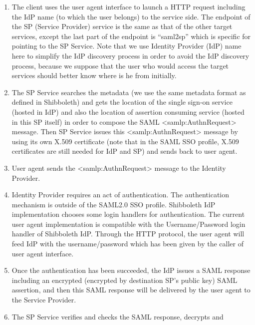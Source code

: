 \documentclass[a4paper]{article}
\newcommand\liststyleLii{%
\renewcommand\theenumi{\arabic{enumi}}
\renewcommand\theenumii{\arabic{enumii}}
\renewcommand\theenumiii{\arabic{enumiii}}
\renewcommand\theenumiv{\arabic{enumiv}}
\renewcommand\labelenumi{\theenumi.}
\renewcommand\labelenumii{\theenumii.}
\renewcommand\labelenumiii{\theenumiii.}
\renewcommand\labelenumiv{\theenumiv.}
}
\begin{document}
\liststyleLii
\begin{enumerate}
\item {\color{black}
The client uses the user agent interface to launch a HTTP request
including the IdP name (to which the user belongs) to the service side.
The endpoint of the SP (Service Provider) service is the same as that
of the other target services, except the last part of the endpoint is
{\textquotedblleft}saml2sp{\textquotedblright} which is specific for
pointing to the SP Service. Note that we use Identity Provider (IdP)
name here to simplify the IdP discovery process in order to avoid the
IdP discovery process, because we suppose that the user who would
access the target services should better know where is he from
initially.}
\item {\color{black}
The SP Service searches the metadata (we use the same metadata format as
defined in Shibboleth) and gets the location of the single sign-on
service (hosted in IdP) and also the location of assertion consuming
service (hosted in this SP itself) in order to compose the SAML
{\textless}samlp:AuthnRequest{\textgreater} message. Then SP Service
issues this {\textless}samlp:AuthnRequest{\textgreater} message by
using its own X.509 certificate (note that in the SAML SSO profile,
X.509 certificates are still needed for IdP and SP) and sends back to
user agent.}
\item {\color{black}
User agent sends the {\textless}samlp:AuthnRequest{\textgreater} message
to the Identity Provider.}
\item {\color{black}
Identity Provider requires an act of authentication. The authentication
mechanism is outside of the SAML2.0 SSO profile. Shibboleth IdP
implementation chooses some login handlers for authentication. The
current user agent implementation is compatible with the
Username/Password login handler of Shibboleth IdP. Through the HTTP
protocol, the user agent will feed IdP with the username/password which
has been given by the caller of user agent interface.}
\item {\color{black}
Once the authentication has been succeeded, the IdP issues a SAML
response including an encrypted (encrypted by destination
SP{\textquoteright}s public key) SAML assertion, and then this SAML
response will be delivered by the user agent to the Service Provider.}
\item {\color{black}
The SP Service verifies and checks the SAML response, decrypts and
}
\end{enumerate}
\end{document}
